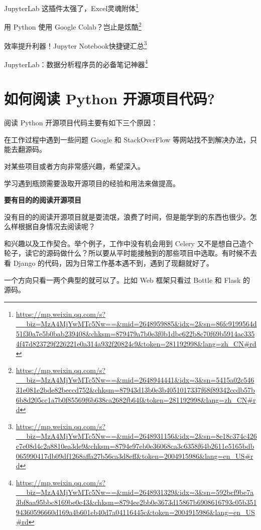 \documentclass[]{ctexbook}
\renewcommand{\href}[2]{#2\footnote{\url{#1}}}
\begin{document}
\href{https://mp.weixin.qq.com/s?__biz=MzA4MjYwMTc5Nw==\&mid=2648959885\&idx=2\&sn=86fc9199564d51f30a7e5b0bab239408\&chksm=879479a7b0e3f0b1dbc622b8c70f69b5914ac3354f47d823729f226221e0a314a932f20824c9\&token=281192998\&lang=zh_CN\#rd}{JupyterLab 这插件太强了，Excel灵魂附体}

\href{https://mp.weixin.qq.com/s?__biz=MzA4MjYwMTc5Nw==\&mid=2648944441\&idx=3\&sn=5415a02c54631e081e2bde82beccd752\&chksm=87943d13b0e3b4051017337f68f89342ccdb57b6b8d205cc1a7b0f85569f6b638ca2682fb64f\&token=281192998\&lang=zh_CN\#rd}{用 Python 使用 Google Colab？岂止是炫酷}

\href{https://mp.weixin.qq.com/s?__biz=MzA4MjYwMTc5Nw==\&mid=2648931156\&idx=2\&sn=8e18c374c426c7e08d4c2a8810ea3de9\&chksm=8794e97eb0e36068ca3c6358f64b2611e5165bdb065990417db09df1268affa27b56ca3d8eff\&token=2004915986\&lang=en_US\#rd}{效率提升利器！Jupyter Notebook快捷键汇总}

\href{https://mp.weixin.qq.com/s?__biz=MzA4MjYwMTc5Nw==\&mid=2648931329\&idx=3\&sn=592bcf9be7a3bf8aa95bbc8169be0e43\&chksm=8794ee2bb0e3673d15867b6908616793c05b35194360596660d169a4b601eb40d7a04116445c\&token=2004915986\&lang=en_US\#rd}{JupyterLab：数据分析程序员的必备笔记神器}

\hypertarget{ux5982ux4f55ux9605ux8bfb-python-ux5f00ux6e90ux9879ux76eeux4ee3ux7801}{%
\section{如何阅读 Python 开源项目代码?}\label{ux5982ux4f55ux9605ux8bfb-python-ux5f00ux6e90ux9879ux76eeux4ee3ux7801}}

阅读 Python 开源项目代码主要有如下三个原因：

在工作过程中遇到一些问题 Google 和 StackOverFlow 等网站找不到解决办法，只能去翻源码。

对某些项目或者方向非常感兴趣，希望深入。

学习遇到瓶颈需要汲取开源项目的经验和用法来做提高。

\textbf{要有目的的阅读开源项目}

没有目的的阅读开源项目就是耍流氓，浪费了时间，但是能学到的东西也很少。怎么样根据自身情况去阅读呢？

和兴趣以及工作契合。举个例子，工作中没有机会用到 Celery 又不是想自己造个轮子，读它的源码做什么？所以要从平时能接触到的那些项目中选取。有时候不去看 Django 的代码，因为日常工作基本遇不到，遇到了现翻就好了。

一个方向只看一两个典型的就可以了。比如 Web 框架只看过 Bottle 和 Flask 的源码。
\end{document}
